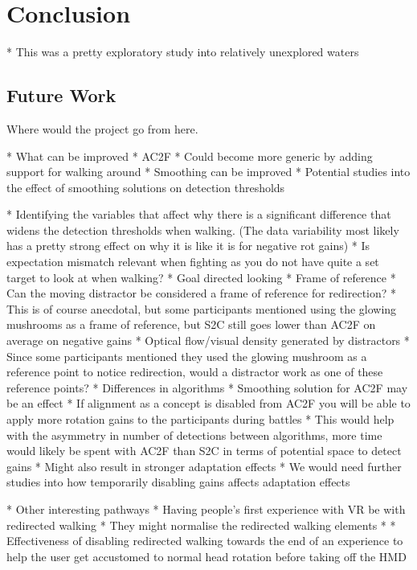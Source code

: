\chapter{Conclusion}
\label{chap:conclusion}

* This was a pretty exploratory study into relatively unexplored waters

\section{Future Work}
\label{sec:future}
Where would the project go from here.

* What can be improved
* AC2F
   * Could become more generic by adding support for walking around
   * Smoothing can be improved
   * Potential studies into the effect of smoothing solutions on detection thresholds

* Identifying the variables that affect why there is a significant difference that widens the detection thresholds when walking. (The data variability most likely has a pretty strong effect on why it is like it is for negative rot gains)
   * Is expectation mismatch relevant when fighting as you do not have quite a set target to look at when walking?
      * Goal directed looking
   * Frame of reference
      * Can the moving distractor be considered a frame of reference for redirection?
      * This is of course anecdotal, but some participants mentioned using the glowing mushrooms as a frame of reference, but S2C still goes lower than AC2F on average on negative gains
      * Optical flow/visual density generated by distractors
         * Since some participants mentioned they used the glowing mushroom as a reference point to notice redirection, would a distractor work as one of these reference points?
   * Differences in algorithms
      * Smoothing solution for AC2F may be an effect
      * If alignment as a concept is disabled from AC2F you will be able to apply more rotation gains to the participants during battles
         * This would help with the asymmetry in number of detections between algorithms, more time would likely be spent with AC2F than S2C in terms of potential space to detect gains
         * Might also result in stronger adaptation effects
            * We would need further studies into how temporarily disabling gains affects adaptation effects

* Other interesting pathways
   * Having people's first experience with VR be with redirected walking
      * They might normalise the redirected walking elements
         * 
   * Effectiveness of disabling redirected walking towards the end of an experience to help the user get accustomed to normal head rotation before taking off the HMD
   
